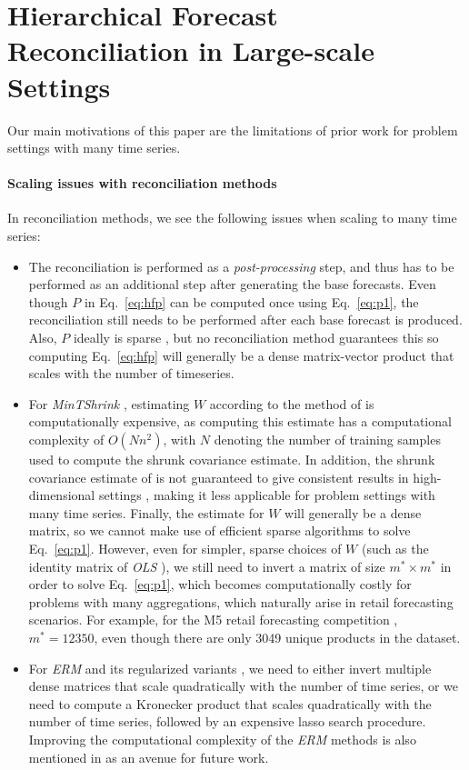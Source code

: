 \documentclass{article}
\begin{document}
\section{Hierarchical Forecast Reconciliation in Large-scale Settings}   \label{sec:ourwork}
Our main motivations of this paper are the limitations of prior work for problem settings with many time series.

\paragraph{Scaling issues with reconciliation methods}
In reconciliation methods, we see the following issues when scaling to many time series:
\begin{itemize}
  \item The reconciliation is performed as a \textit{post-processing} step, and thus has to be performed as an additional step after generating the base forecasts. Even though \(P\) in Eq.~\ref{eq:hfp} can be computed once using Eq.~\eqref{eq:p1}, the reconciliation still needs to be performed after each base forecast is produced. Also, \(P\) ideally is sparse \cite{bentaieb_regularized_2019}, but no reconciliation method guarantees this so computing Eq.~\ref{eq:hfp} will generally be a dense matrix-vector product that scales with the number of timeseries.
  \item For \textit{MinTShrink} \cite{wickramasuriya_optimal_2019}, estimating \(W\) according to the method of \cite{schafer_shrinkage_2005} is computationally expensive, as computing this estimate has a computational complexity of \(O(Nn^2)\), with \(N\) denoting the number of training samples used to compute the shrunk covariance estimate. In addition, the shrunk covariance estimate of \cite{schafer_shrinkage_2005} is not guaranteed to give consistent results in high-dimensional settings \cite{touloumis_nonparametric_2015}, making it less applicable for problem settings with many time series. Finally, the estimate for \(W\) will generally be a dense matrix, so we cannot make use of efficient sparse algorithms to solve Eq.~\eqref{eq:p1}. However, even for simpler, sparse choices of \(W\) (such as the identity matrix of \textit{OLS} \cite{hyndman_optimal_2011}), we still need to invert a matrix of size \(m^* \times m^*\) in order to solve Eq.~\eqref{eq:p1}, which becomes computationally costly for problems with many aggregations, which naturally arise in retail forecasting scenarios. For example, for the M5 retail forecasting competition \cite{makridakis_m5_2020}, \(m^*=12350\), even though there are only 3049 unique products in the dataset.  
  \item For \textit{ERM} and its regularized variants \cite{bentaieb_regularized_2019}, we need to either invert multiple dense matrices that scale quadratically with the number of time series, or we need to compute a Kronecker product that scales quadratically with the number of time series, followed by an expensive lasso search procedure. Improving the computational complexity of the \textit{ERM} methods is also mentioned in \cite{bentaieb_regularized_2019} as an avenue for future work.
\end{itemize}
\end{document}
